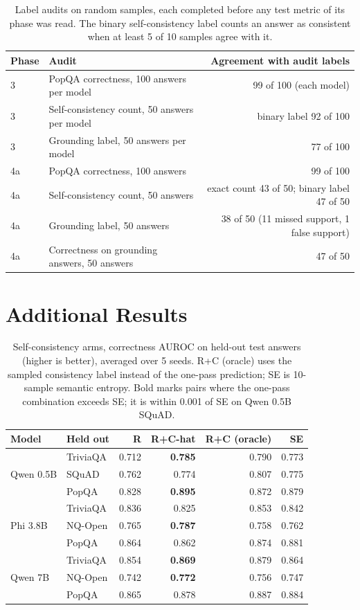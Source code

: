 \documentclass[10pt]{article}
\begin{document}
\begin{table}[h]
\centering
\small
\begin{tabular}{@{}llr@{}}
\toprule
Phase & Audit & Agreement with audit labels \\
\midrule
3 & PopQA correctness, 100 answers per model & 99 of 100 (each model) \\
3 & Self-consistency count, 50 answers per model & binary label 92 of 100 \\
3 & Grounding label, 50 answers per model & 77 of 100 \\
4a & PopQA correctness, 100 answers & 99 of 100 \\
4a & Self-consistency count, 50 answers & exact count 43 of 50; binary label 47 of 50 \\
4a & Grounding label, 50 answers & 38 of 50 (11 missed support, 1 false support) \\
4a & Correctness on grounding answers, 50 answers & 47 of 50 \\
\bottomrule
\end{tabular}
\caption{Label audits on random samples, each completed before any test metric of its phase was read. The binary self-consistency label counts an answer as consistent when at least 5 of 10 samples agree with it.}
\label{tab:audits}
\end{table}

\section{Additional Results}
\label{app:results}

\begin{table}[h]
\centering
\small
\begin{tabular}{@{}llrrrr@{}}
\toprule
Model & Held out & R & R+C-hat & R+C (oracle) & SE \\
\midrule
\multirow{3}{*}{Qwen 0.5B} & TriviaQA & 0.712 & \textbf{0.785} & 0.790 & 0.773 \\
 & SQuAD & 0.762 & 0.774 & 0.807 & 0.775 \\
 & PopQA & 0.828 & \textbf{0.895} & 0.872 & 0.879 \\
\midrule
\multirow{3}{*}{Phi 3.8B} & TriviaQA & 0.836 & 0.825 & 0.853 & 0.842 \\
 & NQ-Open & 0.765 & \textbf{0.787} & 0.758 & 0.762 \\
 & PopQA & 0.864 & 0.862 & 0.874 & 0.881 \\
\midrule
\multirow{3}{*}{Qwen 7B} & TriviaQA & 0.854 & \textbf{0.869} & 0.879 & 0.864 \\
 & NQ-Open & 0.742 & \textbf{0.772} & 0.756 & 0.747 \\
 & PopQA & 0.865 & 0.878 & 0.887 & 0.884 \\
\bottomrule
\end{tabular}
\caption{Self-consistency arms, correctness AUROC on held-out test answers (higher is better), averaged over 5 seeds. R+C (oracle) uses the sampled consistency label instead of the one-pass prediction; SE is 10-sample semantic entropy. Bold marks pairs where the one-pass combination exceeds SE; it is within 0.001 of SE on Qwen 0.5B SQuAD.}
\label{tab:se}
\end{table}
\end{document}
